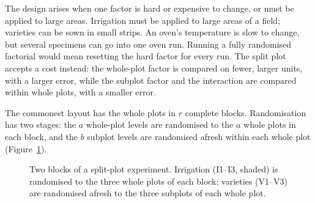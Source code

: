 \documentclass[11pt,a4paper]{article}
\numberwithin{equation}{section}
\theoremstyle{definition}
\begin{document}
The design arises when one factor is hard or expensive to change, or must be applied to large areas. Irrigation must be applied to large areas of
a field; varieties can be sown in small strips. An oven's temperature is slow to change, but several specimens can go into one oven run. Running a
fully randomised factorial would mean resetting the hard factor for every run. The split plot accepts a cost instead: the whole-plot factor is
compared on fewer, larger units, with a larger error, while the subplot factor and the interaction are compared within whole plots, with a smaller
error.

The commonest layout has the whole plots in $r$ complete blocks. Randomisation has two stages: the $a$ whole-plot levels are randomised to the $a$
whole plots in each block, and the $b$ subplot levels are randomised afresh within each whole plot (Figure~\ref{fig:splitplot}).

\begin{figure}[H]
\centering
{}
\caption{Two blocks of a split-plot experiment. Irrigation (I1--I3, shaded) is randomised to the three whole plots of each block; varieties (V1--V3)
are randomised afresh to the three subplots of each whole plot.}
\label{fig:splitplot}
\end{figure}
\end{document}
